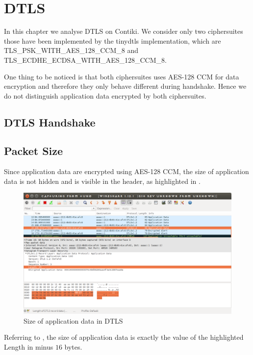 \chapter{DTLS} \label{Chp: DTLS}

In this chapter we analyse DTLS on Contiki. We consider only two ciphersuites those have been implemented by the tinydtls implementation, which are TLS\_PSK\_WITH\_AES\_128\_CCM\_8 and TLS\_ECDHE\_ECDSA\_WITH\_AES\_128\_CCM\_8. 

One thing to be noticed is that both ciphersuites uses AES-128 CCM for data encryption and therefore they only behave different during handshake. Hence we do not distinguish application data encrypted by both ciphersuites.

\section{DTLS Handshake}

\section{Packet Size}

Since application data are encrypted using AES-128 CCM, the size of application data is not hidden and is visible in the header, as highlighted in .

\begin{figure}[ht!]
	\center
	\includegraphics[width=.9\textwidth]{fig/dtlslength.png}
	\caption{Size of application data in DTLS}
	\label{Fig: Size of application data in DTLS}
\end{figure}

Referring to \cite{rfc5116}, the size of application data is exactly the value of the highlighted Length in  minus $16$ bytes.

